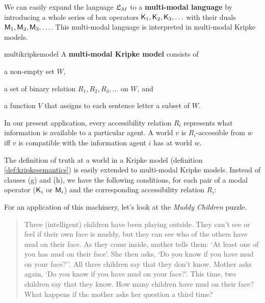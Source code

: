 We can easily expand the language $\mathfrak{L}_M$ to a \textbf{multi-modal language} by
introducing a whole series of box operators $\operatorname{\mathsf{K}{}}_1, \operatorname{\mathsf{K}{}}_2, \operatorname{\mathsf{K}{}}_3, \ldots$ with
their duals $\operatorname{\mathsf{M}}_1, \operatorname{\mathsf{M}}_2, \operatorname{\mathsf{M}}_3, \ldots$. This multi-modal language is
interpreted in multi-modal Kripke models.

\begin{definition}{}{multikripkemodel}
  A \textbf{multi-modal Kripke model} consists of
  \vspace{-3mm}
  \begin{itemize*}
  \item a non-empty set $W$,
  \item a set of binary relation $R_1,R_2,R_{3},\ldots$ on $W$, and
  \item a function $V$ that assigns to each sentence letter a subset of $W$.
  \end{itemize*}
\end{definition}
%
In our present application, every accessibility relation $R_i$ represents what
information is available to a particular agent. A world $v$ is $R_i$-accessible
from $w$ iff $v$ is compatible with the information agent $i$ has at world $w$.

The definition of truth at a world in a Kripke model (definition
\ref{def:kripkesemantics}) is easily extended to multi-modal Kripke models.
Instead of clauses (g) and (h), we have the following conditions, for each pair
of a modal operator ($\operatorname{\mathsf{K}{}}_i$ or $\operatorname{\mathsf{M}}_i$) and the corresponding accessibility
relation $R_i$:

\bigskip
\begin{semantics}
\end{semantics}
\bigskip

For an application of this machinery, let's look at the \emph{Muddy Children}
puzzle.

\begin{quote}
  Three (intelligent) children have been playing outside. They can't see or feel
  if their own face is muddy, but they can see who of the others have mud on
  their face. As they come inside, mother tells them: `At least one of you has mud on
  their face'. She then asks, `Do you know if you have mud on your face?''.
  All three children say that they don't know. Mother asks again, `Do you know
  if you have mud on your face?'. This time, two children say that they know.
  How many children have mud on their face? What happens if the mother
  asks her question a third time?
\end{quote}

